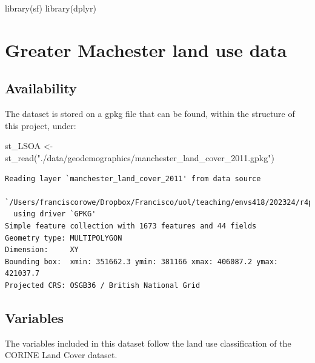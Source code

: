 \documentclass[
  letterpaper,
  DIV=11,
  numbers=noendperiod]{scrreprt}
\newenvironment{Shaded}{\begin{snugshade}}{\end{snugshade}}
\newcommand{\FunctionTok}[1]{\textcolor[rgb]{0.28,0.35,0.67}{#1}}
\newcommand{\NormalTok}[1]{\textcolor[rgb]{0.00,0.23,0.31}{#1}}
\newcommand{\OtherTok}[1]{\textcolor[rgb]{0.00,0.23,0.31}{#1}}
\newcommand{\StringTok}[1]{\textcolor[rgb]{0.13,0.47,0.30}{#1}}
\begin{document}
\begin{Shaded}
\begin{Highlighting}[]
\FunctionTok{library}\NormalTok{(sf)}
\FunctionTok{library}\NormalTok{(dplyr)}
\end{Highlighting}
\end{Shaded}

\hypertarget{greater-machester-land-use-data}{%
\section{Greater Machester land use
data}\label{greater-machester-land-use-data}}

\hypertarget{availability}{%
\subsection*{Availability}\label{availability}}

The dataset is stored on a gpkg file that can be found, within the
structure of this project, under:

\begin{Shaded}
\begin{Highlighting}[]
\NormalTok{st\_LSOA }\OtherTok{\textless{}{-}} \FunctionTok{st\_read}\NormalTok{(}\StringTok{"./data/geodemographics/manchester\_land\_cover\_2011.gpkg"}\NormalTok{)}
\end{Highlighting}
\end{Shaded}

\begin{verbatim}
Reading layer `manchester_land_cover_2011' from data source 
  `/Users/franciscorowe/Dropbox/Francisco/uol/teaching/envs418/202324/r4ps/data/geodemographics/manchester_land_cover_2011.gpkg' 
  using driver `GPKG'
Simple feature collection with 1673 features and 44 fields
Geometry type: MULTIPOLYGON
Dimension:     XY
Bounding box:  xmin: 351662.3 ymin: 381166 xmax: 406087.2 ymax: 421037.7
Projected CRS: OSGB36 / British National Grid
\end{verbatim}

\hypertarget{variables}{%
\subsection*{Variables}\label{variables}}

The variables included in this dataset follow the land use
classification of the CORINE Land Cover dataset.
\end{document}
